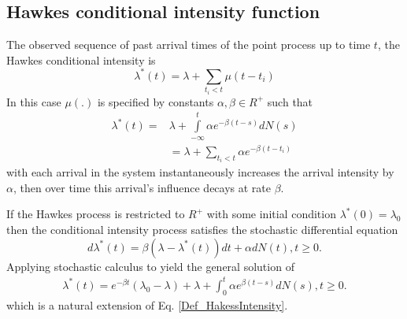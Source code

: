 \subsection{Hawkes conditional intensity function}
\begin{Definition}{}	
	The observed sequence of past arrival times of the point process up to time $t$, the Hawkes conditional intensity is
	$$\lambda^{*}(t) = \lambda + \sum_{t_{i} < t} \mu (t-t_{i})$$
	In this case $\mu(.)$ is specified by constants $\alpha, \beta \in R^{+}$ such that
	\begin{align}
	\label{Def_HakessIntensity}
	\lambda^{*}(t) = &
	\lambda + \displaystyle\int\limits_{-\infty}^{t} \alpha e^{-\beta(t-s)}dN(s) 
	\\
	& = \lambda + \sum_{t_{i} < t}\alpha e^{-\beta(t-t_{i})} \nonumber
	\end{align}
	with each arrival in the system instantaneously increases the arrival intensity by $\alpha$, then over time this arrival’s influence decays at rate $\beta$.
\end{Definition}
If the Hawkes process is restricted to $R^{+}$ with
some initial condition $\lambda^{*}(0) = \lambda_{0}$ then the conditional intensity process satisfies the
stochastic differential equation
$$d\lambda^{*}(t) = \beta(\lambda - \lambda^{*}(t))dt + \alpha dN(t) , t \geq 0 .$$
	Applying stochastic calculus to yield the general solution of	
		\begin{align*}
		\lambda^{*}(t) = e^{-\beta t} (\lambda_{0} - \lambda) +\lambda + \displaystyle\int_{0}^{t} \alpha e^{\beta(t-s)}dN(s), t \geq 0. 
		\end{align*}
	which is a natural extension of Eq. \ref{Def_HakessIntensity}.
	


